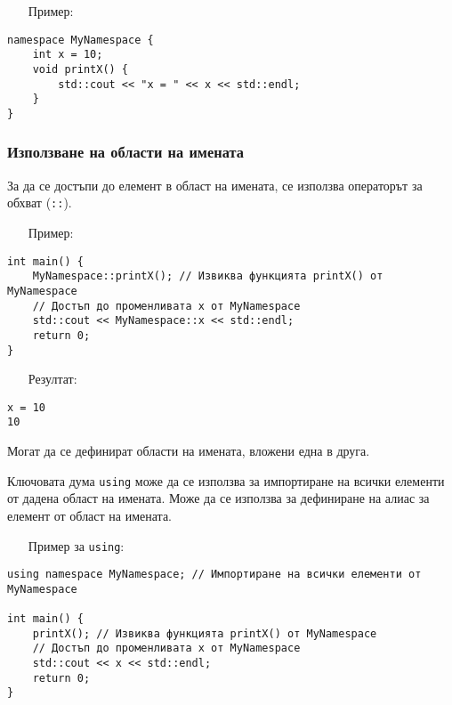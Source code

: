 \documentclass[oneside]{book}
\newcommand*{\code}[1]{\texttt{#1}}
\begin{document}
\begin{itemize}\item[Пример:]\end{itemize}
\begin{mdframed}\begin{lstlisting}
namespace MyNamespace {
    int x = 10;
    void printX() {
        std::cout << "x = " << x << std::endl;
    }
}
\end{lstlisting}\end{mdframed}

\subsubsection{Използване на области на имената}
За да се достъпи до елемент в област на имената, се използва операторът за обхват (\code{::}).
\pagebreak
\begin{itemize}\item[Пример:]\end{itemize}
\begin{mdframed}\begin{lstlisting}
int main() {
    MyNamespace::printX(); // Извиква функцията printX() от MyNamespace
    // Достъп до променливата x от MyNamespace
    std::cout << MyNamespace::x << std::endl;
    return 0;
}
\end{lstlisting}\end{mdframed}

\begin{itemize}\item[Резултат:]\end{itemize}
\begin{mdframed}\begin{lstlisting}[language={}]
x = 10
10
\end{lstlisting}\end{mdframed}

Могат да се дефинират области на имената, вложени една в друга.

Ключовата дума \code{using} може да се използва за импортиране на всички елементи от дадена област на имената.
Може да се използва за дефиниране на алиас за елемент от област на имената.

\begin{itemize}\item[Пример] за \code{using}:\end{itemize}
\begin{mdframed}\begin{lstlisting}
using namespace MyNamespace; // Импортиране на всички елементи от MyNamespace

int main() {
    printX(); // Извиква функцията printX() от MyNamespace
    // Достъп до променливата x от MyNamespace
    std::cout << x << std::endl;
    return 0;
}
\end{lstlisting}\end{mdframed}
\end{document}
